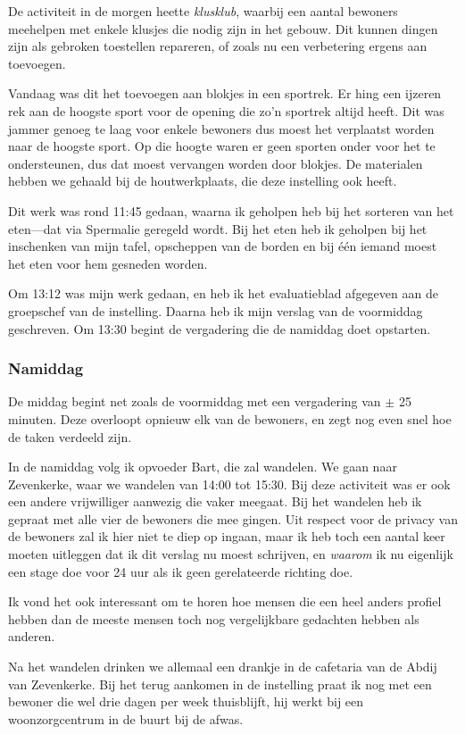 \documentclass[a4paper,12pt]{article}
\begin{document}
De activiteit in de morgen heette \emph{klusklub}, waarbij een aantal bewoners meehelpen met enkele klusjes die nodig zijn in het gebouw. Dit kunnen dingen zijn als gebroken toestellen repareren, of zoals nu een verbetering ergens aan toevoegen.

Vandaag was dit het toevoegen aan blokjes in een sportrek. Er hing een ijzeren rek aan de hoogste sport voor de opening die zo'n sportrek altijd heeft. Dit was jammer genoeg te laag voor enkele bewoners dus moest het verplaatst worden naar de hoogste sport. Op die hoogte waren er geen sporten onder voor het te ondersteunen, dus dat moest vervangen worden door blokjes. De materialen hebben we gehaald bij de houtwerkplaats, die deze instelling ook heeft.

Dit werk was rond 11:45 gedaan, waarna ik geholpen heb bij het sorteren van het eten---dat via Spermalie geregeld wordt. Bij het eten heb ik geholpen bij het inschenken van mijn tafel, opscheppen van de borden en bij één iemand moest het eten voor hem gesneden worden.

Om 13:12 was mijn werk gedaan, en heb ik het evaluatieblad afgegeven aan de groepschef van de instelling. Daarna heb ik mijn verslag van de voormiddag geschreven. Om 13:30 begint de vergadering die de namiddag doet opstarten.

\subsubsection{Namiddag}

De middag begint net zoals de voormiddag met een vergadering van $\pm$ 25 minuten. Deze overloopt opnieuw elk van de bewoners, en zegt nog even snel hoe de taken verdeeld zijn.

In de namiddag volg ik opvoeder Bart, die zal wandelen. We gaan naar Zevenkerke, waar we wandelen van 14:00 tot 15:30. Bij deze activiteit was er ook een andere vrijwilliger aanwezig die vaker meegaat. Bij het wandelen heb ik gepraat met alle vier de bewoners die mee gingen. Uit respect voor de privacy van de bewoners zal ik hier niet te diep op ingaan, maar ik heb toch een aantal keer moeten uitleggen dat ik dit verslag nu moest schrijven, en \emph{waarom} ik nu eigenlijk een stage doe voor 24 uur als ik geen gerelateerde richting doe.

Ik vond het ook interessant om te horen hoe mensen die een heel anders profiel hebben dan de meeste mensen toch nog vergelijkbare gedachten hebben als anderen.

Na het wandelen drinken we allemaal een drankje in de cafetaria van de Abdij van Zevenkerke. Bij het terug aankomen in de instelling praat ik nog met een bewoner die wel drie dagen per week thuisblijft, hij werkt bij een woonzorgcentrum in de buurt bij de afwas.
\end{document}
